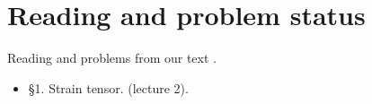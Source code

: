 \chapter{Reading and problem status}

Reading and problems from our text \cite{}.

\begin{itemize}
\item \cite{landau1960theory} \S 1.  Strain tensor. (lecture 2).
\end{itemize}

